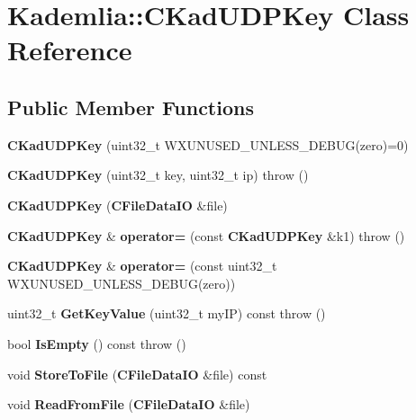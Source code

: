 \section{Kademlia::CKadUDPKey Class Reference}
\label{classKademlia_1_1CKadUDPKey}
\subsection*{Public Member Functions}
\begin{DoxyCompactItemize}
\item 
{\bfseries CKadUDPKey} (uint32\_\-t WXUNUSED\_\-UNLESS\_\-DEBUG(zero)=0)\label{classKademlia_1_1CKadUDPKey_a7e4358e0384b6bfcd1502ea3d3420cec}

\item 
{\bfseries CKadUDPKey} (uint32\_\-t key, uint32\_\-t ip)  throw ()\label{classKademlia_1_1CKadUDPKey_a7d0e0d63c3e11a1e604547629f76f265}

\item 
{\bfseries CKadUDPKey} ({\bf CFileDataIO} \&file)\label{classKademlia_1_1CKadUDPKey_ad63d648f1231c12fdf7734831a5d50ba}

\item 
{\bf CKadUDPKey} \& {\bfseries operator=} (const {\bf CKadUDPKey} \&k1)  throw ()\label{classKademlia_1_1CKadUDPKey_a49ee48c9838a2b6fac0283e4b2b66304}

\item 
{\bf CKadUDPKey} \& {\bfseries operator=} (const uint32\_\-t WXUNUSED\_\-UNLESS\_\-DEBUG(zero))\label{classKademlia_1_1CKadUDPKey_a2c3e05c12fdff55dd7322bf7c48b1a5e}

\item 
uint32\_\-t {\bfseries GetKeyValue} (uint32\_\-t myIP) const   throw ()\label{classKademlia_1_1CKadUDPKey_a2954586ffce4a4025c3df7654653a782}

\item 
bool {\bfseries IsEmpty} () const   throw ()\label{classKademlia_1_1CKadUDPKey_a19d3990379278f18577436f4f2388346}

\item 
void {\bfseries StoreToFile} ({\bf CFileDataIO} \&file) const \label{classKademlia_1_1CKadUDPKey_a4287e2a01bdb2aa961e85cf9a8f87cc5}

\item 
void {\bfseries ReadFromFile} ({\bf CFileDataIO} \&file)\label{classKademlia_1_1CKadUDPKey_a35ca786ad4db8e4e382caf6a88aba5da}

\end{DoxyCompactItemize}
